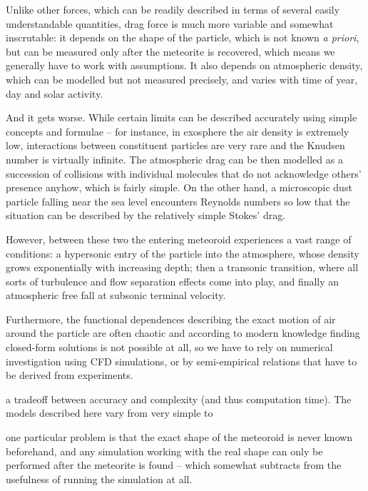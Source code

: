         Unlike other forces, which can be readily described in terms of several easily understandable
        quantities, drag force is much more variable and somewhat inscrutable: it depends on the shape
        of the particle, which is not known \textit{a priori}, but can be measured only after
        the meteorite is recovered, which means we generally have to work with assumptions.
        It also depends on atmospheric density, which can be modelled but not measured precisely,
        and varies with time of year, day and solar activity.

        And it gets worse. While certain limits can be described accurately using
        simple concepts and formulae -- for instance, in exosphere the air density is extremely low,
        interactions between constituent particles are very rare and the Knudsen number is virtually infinite.
        The atmospheric drag can be then modelled as a succession of collisions with individual
        molecules that do not acknowledge others' presence anyhow, which is fairly simple.
        On the other hand, a microscopic dust particle falling near the sea level encounters
        Reynolds numbers so low that the situation can be described by the relatively simple Stokes' drag.

        However, between these two the entering meteoroid experiences a vast range of conditions:
        a hypersonic entry of the particle into the atmosphere, whose density grows exponentially with increasing depth;
        then a transonic transition, where all sorts of turbulence and flow separation effects come into play,
        and finally an atmospheric free fall at subsonic terminal velocity.

        Furthermore, the functional dependences describing the exact motion
        of air around the particle are often chaotic and according to modern knowledge
        finding closed-form solutions is not possible at all, so we have to rely
        on numerical investigation using CFD simulations, or by semi-empirical
        relations that have to be derived from experiments.


        a tradeoff between accuracy and complexity (and thus computation time).
        The models described here vary from very simple to 

        one particular problem is that the exact shape of the meteoroid is never known beforehand,
        and any simulation working with the real shape can only be performed after the meteorite is
        found -- which somewhat subtracts from the usefulness of running the simulation at all.

